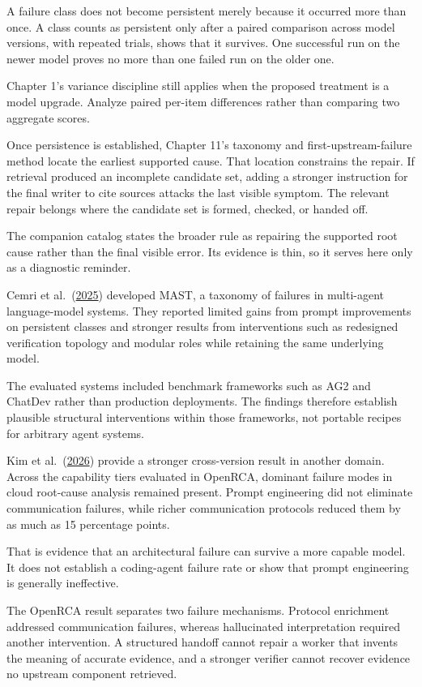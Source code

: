 A failure class does not become persistent merely because it occurred more than once. A class counts as persistent only after a paired comparison across model versions, with repeated trials, shows that it survives. One successful run on the newer model proves no more than one failed run on the older one.

Chapter 1's variance discipline still applies when the proposed treatment is a model upgrade. Analyze paired per-item differences rather than comparing two aggregate scores.

Once persistence is established, Chapter 11's taxonomy and first-upstream-failure method locate the earliest supported cause. That location constrains the repair. If retrieval produced an incomplete candidate set, adding a stronger instruction for the final writer to cite sources attacks the last visible symptom. The relevant repair belongs where the candidate set is formed, checked, or handed off.

The companion catalog states the broader rule as repairing the supported root cause rather than the final visible error. Its evidence is thin, so it serves here only as a diagnostic reminder.

Cemri et al.~(\href{https://arxiv.org/abs/2503.13657}{2025}) developed MAST, a taxonomy of failures in multi-agent language-model systems. They reported limited gains from prompt improvements on persistent classes and stronger results from interventions such as redesigned verification topology and modular roles while retaining the same underlying model.

The evaluated systems included benchmark frameworks such as AG2 and ChatDev rather than production deployments. The findings therefore establish plausible structural interventions within those frameworks, not portable recipes for arbitrary agent systems.

Kim et al.~(\href{https://arxiv.org/abs/2602.09937}{2026}) provide a stronger cross-version result in another domain. Across the capability tiers evaluated in OpenRCA, dominant failure modes in cloud root-cause analysis remained present. Prompt engineering did not eliminate communication failures, while richer communication protocols reduced them by as much as 15 percentage points.

That is evidence that an architectural failure can survive a more capable model. It does not establish a coding-agent failure rate or show that prompt engineering is generally ineffective.

The OpenRCA result separates two failure mechanisms. Protocol enrichment addressed communication failures, whereas hallucinated interpretation required another intervention. A structured handoff cannot repair a worker that invents the meaning of accurate evidence, and a stronger verifier cannot recover evidence no upstream component retrieved.


